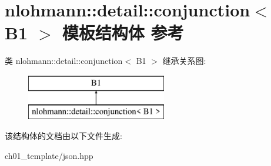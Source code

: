 \hypertarget{structnlohmann_1_1detail_1_1conjunction_3_01_b1_01_4}{}\section{nlohmann\+::detail\+::conjunction$<$ B1 $>$ 模板结构体 参考}
\label{structnlohmann_1_1detail_1_1conjunction_3_01_b1_01_4}
类 nlohmann\+::detail\+::conjunction$<$ B1 $>$ 继承关系图\+:\begin{figure}[H]
\begin{center}
\leavevmode
\includegraphics[height=2.000000cm]{structnlohmann_1_1detail_1_1conjunction_3_01_b1_01_4}
\end{center}
\end{figure}


该结构体的文档由以下文件生成\+:\begin{DoxyCompactItemize}
\item 
ch01\+\_\+template/json.\+hpp\end{DoxyCompactItemize}
